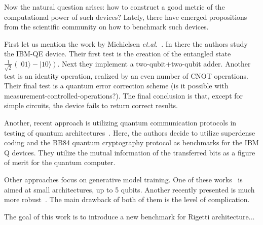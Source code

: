 \documentclass[preprint,12pt, a4paper]{elsarticle}
\newcommand{\ket}[1]{\ensuremath{|#1\rangle}}
\newcommand{\1}{{\rm 1\hspace{-0.9mm}l}}
\begin{document}

%
%	


Now the natural question arises: how to construct a good metric of the
computational power of such devices? 
Lately, there have emerged propositions from the scientific community on how to
benchmark such devices.

 First let us mention the work by Michielsen
\emph{et.al.}~\cite{michielsen2017benchmarking}. In there the authors study the
IBM-QE device. Their first test is the creation of the entangled state
$\frac{1}{\sqrt{2}} (\ket{01} - \ket{10})$. Next they implement a
two-qubit+two-qubit adder. Another test is an identity operation, realized by an
even number of CNOT operations. Their final test is a quantum error correction
scheme (is it possible with measurement-controlled-operations?). The final
conclusion is that, except for simple circuits, the device fails to return
correct results.

Another, recent approach is utilizing quantum communication protocols in testing
of quantum architectures~\cite{zhukov2019quantum}. Here, the authors decide to
utilize superdense coding and the BB84 quantum cryptography protocol as
benchmarks for the IBM Q devices. They utilize the mutual information of the
transferred bits as a figure of merit for the quantum computer.

Other approaches focus on generative model training. One of these
works~\cite{hamilton2018generative} is aimed at small architectures, up to 5
qubits. Another recently presented is much more
robust~\cite{benedetti2018generative}. The main drawback of both of them is the
level of complication.



The goal of this work is to introduce a new benchmark for Rigetti architecture...


\label{}
\end{document}
